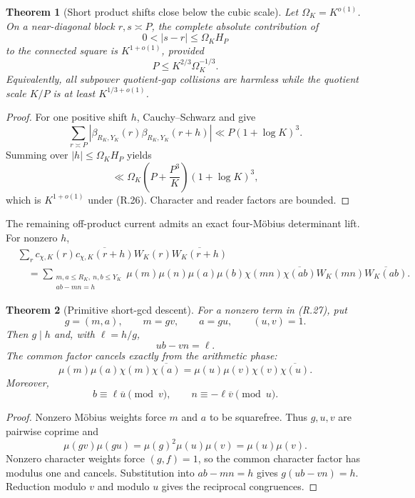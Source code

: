 \documentclass[11pt]{article}
\newtheorem{theorem}{Theorem}[section]
\theoremstyle{definition}
\theoremstyle{remark}
\begin{document}
\begin{theorem}[Short product shifts close below the cubic scale]
\label{thm:rectangular-short-shifts}
Let $\Omega_K=K^{o(1)}$.  On a near-diagonal block $r,s\asymp P$, the
complete absolute contribution of
\[
 0<|s-r|\le\Omega_KH_P
\]
to the connected square is $K^{1+o(1)}$, provided
\[
 \boxed{P\le K^{2/3}\Omega_K^{-1/3}.}
 \tag{R.26}
\]
Equivalently, all subpower quotient-gap collisions are harmless while the
quotient scale $K/P$ is at least $K^{1/3+o(1)}$.
\end{theorem}

\begin{proof}
For one positive shift $h$, Cauchy--Schwarz and
 give
\[
 \sum_{r\asymp P}
 |\beta_{R_K,Y_K}(r)\beta_{R_K,Y_K}(r+h)|
 \ll P(1+\log K)^3.
\]
Summing over $|h|\le\Omega_KH_P$ yields
\[
 \ll\Omega_K\left(P+\frac{P^3}{K}\right)(1+\log K)^3,
\]
which is $K^{1+o(1)}$ under \textup{(R.26)}.  Character and reader factors
are bounded.
\end{proof}

The remaining off-product current admits an exact four-M\"obius determinant
lift.  For nonzero $h$,
\[
 \boxed{
 \begin{aligned}
 &\sum_r c_{\chi,K}(r)\overline{c_{\chi,K}(r+h)}
 W_K(r)\overline{W_K(r+h)}\\
 &\quad=
 \sum_{\substack{m,a\le R_K,\ n,b\le Y_K\\ab-mn=h}}
 \mu(m)\mu(n)\mu(a)\mu(b)
 \chi(mn)\overline{\chi(ab)}
 W_K(mn)\overline{W_K(ab)}.
 \end{aligned}}
 \tag{R.27}
\]

\begin{theorem}[Primitive short-gcd descent]
\label{thm:rectangular-short-gcd}
For a nonzero term in \textup{(R.27)}, put
\[
 g=(m,a),\qquad m=gv,\qquad a=gu,\qquad (u,v)=1.
\]
Then $g\mid h$ and, with $\ell=h/g$,
\[
 \boxed{ub-vn=\ell.}
 \tag{R.28}
\]
The common factor cancels exactly from the arithmetic phase:
\[
 \boxed{
 \mu(m)\mu(a)\chi(m)\overline{\chi(a)}
 =\mu(u)\mu(v)\chi(v)\overline{\chi(u)}.}
 \tag{R.29}
\]
Moreover,
\[
 \boxed{
 b\equiv\ell\overline u\pmod v,
 \qquad
 n\equiv-\ell\overline v\pmod u.}
 \tag{R.30}
\]
\end{theorem}

\begin{proof}
Nonzero M\"obius weights force $m$ and $a$ to be squarefree.  Thus $g,u,v$
are pairwise coprime and
\[
 \mu(gv)\mu(gu)=\mu(g)^2\mu(u)\mu(v)=\mu(u)\mu(v).
\]
Nonzero character weights force $(g,f)=1$, so the common character factor has
modulus one and cancels.  Substitution into $ab-mn=h$ gives
$g(ub-vn)=h$.  Reduction modulo $v$ and modulo $u$ gives the reciprocal
congruences.
\end{proof}
\end{document}
